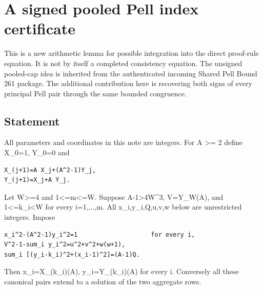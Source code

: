 \section{A signed pooled Pell index certificate}



This is a new arithmetic lemma for possible integration into the direct proof-rule equation. It is not by itself a completed consistency equation. The unsigned pooled-cap idea is inherited from the authenticated incoming Shared Pell Bound 261 package. The additional contribution here is recovering both signs of every principal Pell pair through the same bounded congruence.



\subsection{Statement}



All parameters and coordinates in this note are integers. For A \textgreater{}\allowbreak{}=\allowbreak{} 2 define X\_\allowbreak{}0=\allowbreak{}1, Y\_\allowbreak{}0=\allowbreak{}0 and



\begin{verbatim}
X_(j+1)=A X_j+(A^2-1)Y_j,
Y_(j+1)=X_j+A Y_j.
\end{verbatim}

Let W\textgreater{}\allowbreak{}=\allowbreak{}4 and 1\textless{}\allowbreak{}=\allowbreak{}m\textless{}\allowbreak{}=\allowbreak{}W. Suppose A-1\textgreater{}\allowbreak{}4W\textasciicircum{}\allowbreak{}3, V=\allowbreak{}Y\_\allowbreak{}W(A), and 1\textless{}\allowbreak{}=\allowbreak{}k\_\allowbreak{}i\textless{}\allowbreak{}W for every i=\allowbreak{}1,...,m. All x\_\allowbreak{}i,y\_\allowbreak{}i,Q,u,v,w below are unrestricted integers. Impose



\begin{verbatim}
x_i^2-(A^2-1)y_i^2=1                    for every i,
V^2-1-sum_i y_i^2=u^2+v^2+w(w+1),
sum_i [(y_i-k_i)^2+(x_i-1)^2]=(A-1)Q.
\end{verbatim}

Then x\_\allowbreak{}i=\allowbreak{}X\_\allowbreak{}(k\_\allowbreak{}i)(A), y\_\allowbreak{}i=\allowbreak{}Y\_\allowbreak{}(k\_\allowbreak{}i)(A) for every i. Conversely all these canonical pairs extend to a solution of the two aggregate rows.



